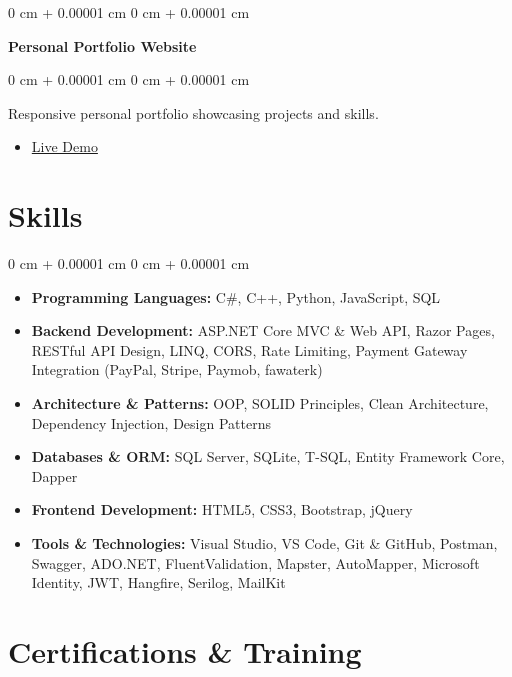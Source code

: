 \documentclass[10pt, letterpaper]{article}
\newenvironment{highlights}{
    \begin{itemize}[
        topsep=0.10 cm,
        parsep=0.10 cm,
        partopsep=0pt,
        itemsep=0pt,
        leftmargin=0 cm + 10pt
    ]
}{
    \end{itemize}
} %
\newenvironment{onecolentry}{
    \begin{adjustwidth}{
        0 cm + 0.00001 cm
    }{
        0 cm + 0.00001 cm
    }
}{
    \end{adjustwidth}
} %
\newenvironment{twocolentry}[2][]{
    \onecolentry
    \def\secondColumn{#2}
    \setcolumnwidth{\fill, 4.5 cm}
    \begin{paracol}{2}
}{
    \switchcolumn \raggedleft \secondColumn
    \end{paracol}
    \endonecolentry
} %
\begin{document}
    \begin{twocolentry}{}
        \textbf{Personal Portfolio Website}
    \end{twocolentry}
    \begin{onecolentry}
        Responsive personal portfolio showcasing projects and skills.
        \begin{highlights}
            \item \href{https://m7-trojan.github.io/TROJAN-Portfolio}{Live Demo}
        \end{highlights}
    \end{onecolentry}
    
    \section{Skills}
    
    \begin{onecolentry}
        \begin{highlights}
            \item \textbf{Programming Languages:} C\#, C++, Python, JavaScript, SQL
            \item \textbf{Backend Development:} ASP.NET Core MVC \& Web API, Razor Pages, RESTful API Design, LINQ, CORS, Rate Limiting, Payment Gateway Integration (PayPal, Stripe, Paymob, fawaterk)
            \item \textbf{Architecture \& Patterns:} OOP, SOLID Principles, Clean Architecture, Dependency Injection, Design Patterns
            \item \textbf{Databases \& ORM:} SQL Server, SQLite, T-SQL, Entity Framework Core, Dapper
            \item \textbf{Frontend Development:} HTML5, CSS3, Bootstrap, jQuery
            \item \textbf{Tools \& Technologies:} Visual Studio, VS Code, Git \& GitHub, Postman, Swagger, ADO.NET, FluentValidation, Mapster, AutoMapper, Microsoft Identity, JWT, Hangfire, Serilog, MailKit
        \end{highlights}
    \end{onecolentry}

    \section{Certifications \& Training}
\end{document}
